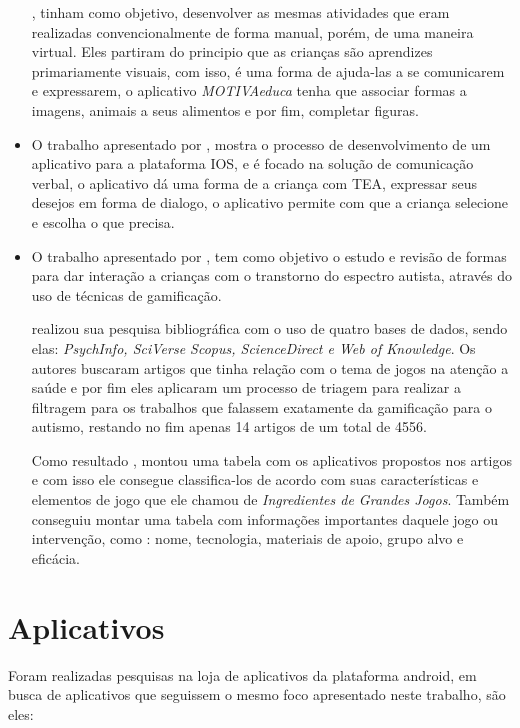 \begin{itemize}
	, tinham como objetivo, desenvolver  as mesmas atividades que eram realizadas convencionalmente de forma manual, porém, de uma maneira virtual. Eles partiram do principio que as crianças são aprendizes primariamente visuais, com isso, é uma forma de ajuda-las a se comunicarem  e expressarem, o aplicativo \textit{MOTIVAeduca} tenha que associar formas a imagens, animais a seus alimentos e por fim, completar figuras.
	
	\item O trabalho apresentado por , mostra o processo de desenvolvimento de um aplicativo para a plataforma IOS, e é focado na solução de comunicação verbal, o aplicativo dá uma forma de a criança com TEA, expressar seus desejos em forma de dialogo, o aplicativo permite com que a criança selecione e escolha o que precisa.
	
	\item O trabalho apresentado por , tem como objetivo o estudo e revisão de formas para dar interação a crianças com o transtorno do espectro autista, através do uso de técnicas de gamificação.
	
	 realizou sua pesquisa bibliográfica com o uso de quatro bases de dados, sendo elas: \textit{PsychInfo, SciVerse Scopus, ScienceDirect e Web of Knowledge}. Os autores buscaram artigos que tinha relação com o tema de jogos na atenção a saúde e por fim eles aplicaram um processo de triagem para realizar a filtragem para os trabalhos que falassem exatamente da gamificação para o autismo, restando no fim apenas 14 artigos de um total de 4556.
	
	Como resultado , montou uma tabela com os aplicativos propostos nos artigos e com isso ele consegue classifica-los de acordo com suas características e elementos de jogo que ele chamou de \textit{Ingredientes de Grandes Jogos}. Também conseguiu montar uma tabela com informações importantes daquele jogo ou intervenção, como : nome, tecnologia, materiais de apoio, grupo alvo e eficácia.
\end{itemize}

\section{Aplicativos}

Foram realizadas pesquisas na loja de aplicativos da plataforma android, em busca de aplicativos que seguissem o mesmo foco apresentado neste trabalho, são eles:

